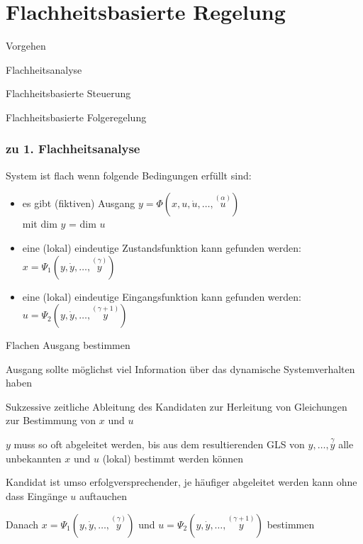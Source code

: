 \documentclass[german]{latex4ei/latex4ei_sheet}
\newcommand{\os}[2]{\ensuremath{\overset{#1}{#2}}}
\begin{document}
\section{Flachheitsbasierte Regelung}
\begin{sectionbox}
\begin{cookbox}{Vorgehen}
  \item Flachheitsanalyse
  \item Flachheitsbasierte Steuerung
  \item Flachheitsbasierte Folgeregelung
\end{cookbox}

\subsubsection{zu 1. Flachheitsanalyse}
System ist flach wenn folgende Bedingungen erfüllt sind:
\begin{itemize}
  \item es gibt (fiktiven) Ausgang $y = \Phi(x, u, \dot{u}, \dots, \os{(\alpha)}{u})$ \\
    mit dim $y$ = dim $u$
  \item eine (lokal) eindeutige Zustandsfunktion kann gefunden werden: \\
    $x = \Psi_1 (y, \dot{y}, \dots, \os{(\gamma)}{y})$
  \item eine (lokal) eindeutige Eingangsfunktion kann gefunden werden: \\
    $u = \Psi_2 (y, \dot{y}, \dots, \os{(\gamma +1)}{y})$
\end{itemize}

\begin{cookbox}{Flachen Ausgang bestimmen}
  \item Ausgang sollte möglichst viel Information über das dynamische Systemverhalten haben
  \item Sukzessive zeitliche Ableitung des Kandidaten zur Herleitung von Gleichungen zur Bestimmung von $x$ und $u$
  \item $y$ muss so oft abgeleitet werden, bis aus dem resultierenden GLS von $y,\dots,\os{\gamma}{y}$ alle unbekannten $x$ und $u$ (lokal) bestimmt werden können
  \item Kandidat ist umso erfolgversprechender, je häufiger abgeleitet werden kann ohne dass Eingänge $u$ auftauchen
\end{cookbox}

Danach $x = \Psi_1 (y, \dot{y}, \dots, \os{(\gamma)}{y})$ und $u = \Psi_2 (y, \dot{y}, \dots, \os{(\gamma +1)}{y})$ bestimmen


\end{sectionbox}
\end{document}
